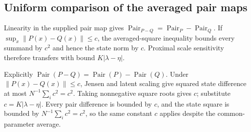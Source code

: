 \documentclass[11pt,a4paper]{report}
\begin{document}
\subsection{\texorpdfstring{Uniform comparison of the averaged pair maps}{Uniform comparison of the averaged pair maps}}
\label{report-step-ProximalLangevin-ProxParameter-lean-3}


Linearity in the supplied pair map gives \(\operatorname{Pair}_{P-Q}=\operatorname{Pair}_P-\operatorname{Pair}_Q\). If \(\sup_x\|P(x)-Q(x)\|\le c\), the averaged-square inequality bounds every summand by \(c^2\) and hence the state norm by \(c\). Proximal scale sensitivity therefore transfers with bound \(K|\lambda-\eta|\).



Explicitly \(\operatorname{Pair}(P-Q)=\operatorname{Pair}(P)-\operatorname{Pair}(Q)\). Under \(\|P(x)-Q(x)\|\le c\), Jensen and latent scaling give squared state difference at most \(N^{-1}\sum_i c^2=c^2\). Taking nonnegative square roots gives \(c\); substitute \(c=K|\lambda-\eta|\). Every pair difference is bounded by \(c\), and the state square is bounded by \(N^{-1}\sum_i c^2=c^2\), so the same constant \(c\) applies despite the common-parameter average.
\end{document}

